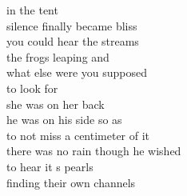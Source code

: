 in the tent\\
silence finally became bliss\\
you could hear the streams\\
the frogs leaping and\\
what else were you supposed\\
to look for\\

she was on her back\\
he was on his side so as\\
to not miss a centimeter of it\\
there was no rain though he wished\\
to hear it s pearls\\
finding their own channels\\
